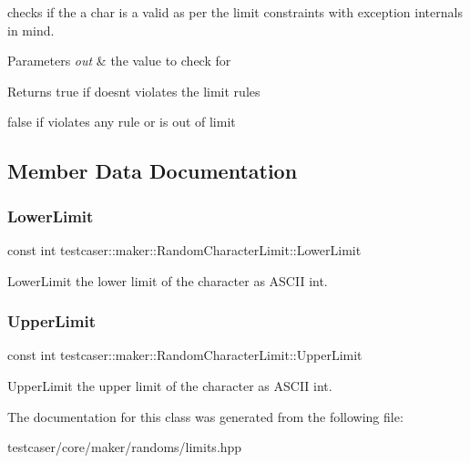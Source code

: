 checks if the a char is a valid as per the limit constraints with exception internals in mind. 


\begin{DoxyParams}{Parameters}
{\em out} & the value to check for \\
\hline
\end{DoxyParams}
\begin{DoxyReturn}{Returns}
true if doesn\textquotesingle{}t violates the limit rules 

false if violates any rule or is out of limit 
\end{DoxyReturn}


\subsection{Member Data Documentation}
\mbox{\label{classtestcaser_1_1maker_1_1RandomCharacterLimit_a152f8b1958ceec1128967cefa40891d9}} 
\subsubsection{\texorpdfstring{LowerLimit}{LowerLimit}}
{\footnotesize\ttfamily const int testcaser\+::maker\+::\+Random\+Character\+Limit\+::\+Lower\+Limit}



Lower\+Limit the lower limit of the character as A\+S\+C\+II int. 

\mbox{\label{classtestcaser_1_1maker_1_1RandomCharacterLimit_adf6f29860db063472c941a169b918667}} 
\subsubsection{\texorpdfstring{UpperLimit}{UpperLimit}}
{\footnotesize\ttfamily const int testcaser\+::maker\+::\+Random\+Character\+Limit\+::\+Upper\+Limit}



Upper\+Limit the upper limit of the character as A\+S\+C\+II int. 



The documentation for this class was generated from the following file\+:\begin{DoxyCompactItemize}
\item 
testcaser/core/maker/randoms/limits.\+hpp\end{DoxyCompactItemize}

